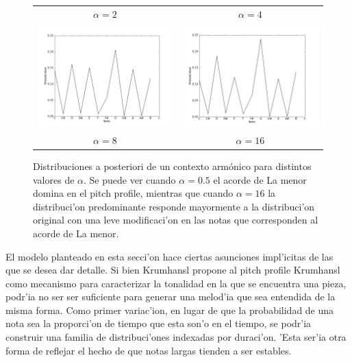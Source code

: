 \begin{figure}[htp]
\begin{center}
\begin{tabular}{cc}
        $\alpha=2$ & $\alpha=4$ \\
        \includegraphics[width=7.5cm]{images/posteriors/posterior-profile-8.png} &
        \includegraphics[width=7.5cm]{images/posteriors/posterior-profile-16.png} \\
        $\alpha=8$ & $\alpha=16$ \\

        \end{tabular}
        \caption{Distribuciones a posteriori de un contexto arm\'onico para distintos valores de $\alpha$. Se puede ver cuando $\alpha=0.5$ el acorde de La menor 
        domina en el pitch profile, mientras que cuando $\alpha=16$ la distribuci'on predominante responde mayormente a la distribuci'on original con una leve modificaci'on
        en las notas que corresponden al acorde de La menor.}
        \label{fig:pitch_posteriors}
    \end{center}      
\end{figure}

El modelo planteado en esta secci'on hace ciertas asunciones impl'icitas de las que se desea dar detalle. 
Si bien Krumhansl propone al pitch profile Krumhansl como mecanismo para caracterizar la tonalidad en la que se encuentra una pieza, 
podr'ia no ser ser suficiente para generar una melod'ia que sea entendida de la misma forma. 
Como primer variac'ion, en lugar de que la probabilidad de una nota sea la proporci'on de tiempo que esta son'o en el tiempo, 
se podr'ia construir una familia de distribuci'ones indexadas por duraci'on. 'Esta ser'ia otra forma de reflejar el hecho de que notas largas tienden a ser estables.

